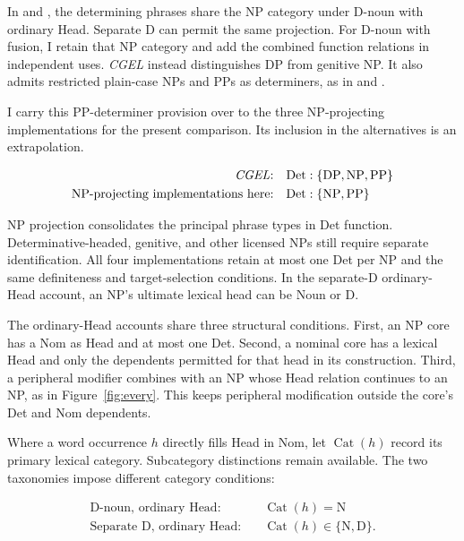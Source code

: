 In  and , the determining phrases share the NP category under D-noun with ordinary Head. Separate D can permit the same projection. For D-noun with fusion, I retain that NP category and add the combined function relations in independent uses. \textit{CGEL} instead distinguishes DP from genitive NP. It also admits restricted plain-case NPs and PPs as determiners, as in  and  \citep[Ch.~5, §4]{huddleston2002}.

I carry this PP-determiner provision over to the three NP-projecting implementations for the present comparison. Its inclusion in the alternatives is an extrapolation.

\[
\begin{aligned}
\text{\textit{CGEL}:} &\quad \mathrm{Det}:\{\mathrm{DP},\mathrm{NP},\mathrm{PP}\} \\
\text{NP-projecting implementations here:} &\quad \mathrm{Det}:\{\mathrm{NP},\mathrm{PP}\}
\end{aligned}
\]

NP projection consolidates the principal phrase types in Det function. Determinative-headed, genitive, and other licensed NPs still require separate identification. All four implementations retain at most one Det per NP and the same definiteness and target-selection conditions. In the separate-D ordinary-Head account, an NP's ultimate lexical head can be Noun or D.

The ordinary-Head accounts share three structural conditions. First, an NP core has a Nom as Head and at most one Det. Second, a nominal core has a lexical Head and only the dependents permitted for that head in its construction. Third, a peripheral modifier combines with an NP whose Head relation continues to an NP, as in Figure~\ref{fig:every}. This keeps peripheral modification outside the core's Det and Nom dependents.

Where a word occurrence $h$ directly fills Head in Nom, let $\operatorname{Cat}(h)$ record its primary lexical category. Subcategory distinctions remain available. The two taxonomies impose different category conditions:

\[
\begin{aligned}
\text{D-noun, ordinary Head:} &\quad \operatorname{Cat}(h)=\mathrm{N} \\
\text{Separate D, ordinary Head:} &\quad \operatorname{Cat}(h)\in\{\mathrm{N},\mathrm{D}\}.
\end{aligned}
\]

